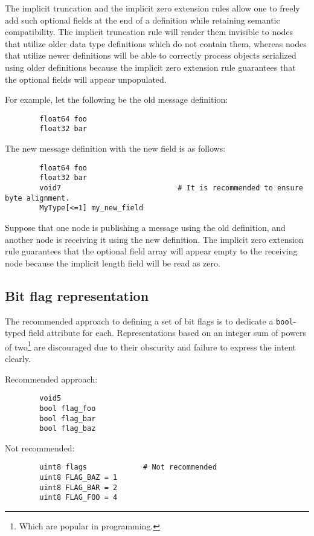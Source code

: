 \begin{remark}[breakable]
    The implicit truncation and the implicit zero extension rules allow one to freely add such optional fields
    at the end of a definition while retaining semantic compatibility.
    The implicit truncation rule will render them invisible to nodes that utilize older data type definitions
    which do not contain them, whereas nodes that utilize newer definitions will be able to correctly process
    objects serialized using older definitions because the implicit zero extension rule guarantees
    that the optional fields will appear unpopulated.

    For example, let the following be the old message definition:

    \begin{verbatim}
        float64 foo
        float32 bar
    \end{verbatim}

    The new message definition with the new field is as follows:

    \begin{verbatim}
        float64 foo
        float32 bar
        void7                           # It is recommended to ensure byte alignment.
        MyType[<=1] my_new_field
    \end{verbatim}

    Suppose that one node is publishing a message using the old definition,
    and another node is receiving it using the new definition.
    The implicit zero extension rule guarantees that the optional field array will
    appear empty to the receiving node because the implicit length field will be read as zero.
\end{remark}

\subsection{Bit flag representation}

The recommended approach to defining a set of bit flags is to dedicate a \verb|bool|-typed field attribute for each.
Representations based on an integer sum of powers of two\footnote{Which are popular in programming.}
are discouraged due to their obscurity and failure to express the intent clearly.

\begin{remark}
    Recommended approach:

    \begin{verbatim}
        void5
        bool flag_foo
        bool flag_bar
        bool flag_baz
    \end{verbatim}

    Not recommended:

    \begin{verbatim}
        uint8 flags             # Not recommended
        uint8 FLAG_BAZ = 1
        uint8 FLAG_BAR = 2
        uint8 FLAG_FOO = 4
    \end{verbatim}
\end{remark}
